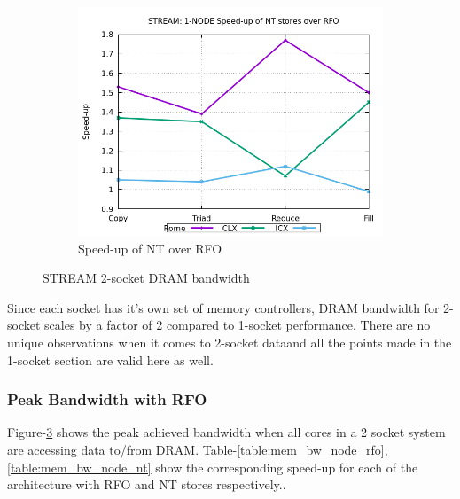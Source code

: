 \documentclass{article}
\begin{document}
\begin{figure}[!ht]
\begin{subfigure}[!hb]{0.3\textwidth}
         \label{figure:mem_bw_node_nt}
    \end{subfigure}
    \begin{subfigure}[!hb]{0.3\textwidth}
         \centering
         \includegraphics[width=\textwidth]{../mem_bw_node/mb_node_nt_rfo}
         \caption{Speed-up of NT over RFO}
         \label{figure:mem_bw_node_nt_rfo}
    \end{subfigure}

    \caption{STREAM 2-socket DRAM bandwidth}
    \label{figure:mem_bw_node}
\end{figure}


Since each socket has it's own set of memory controllers, DRAM bandwidth for 2-socket scales by a factor of 2 compared to 1-socket performance. There are no unique observations when it comes to 2-socket dataand all the points made in the 1-socket section are valid here as well.
\subsubsection{Peak Bandwidth with RFO}
Figure-\ref{figure:mem_bw_node} shows the peak achieved bandwidth when all cores in a 2 socket system are accessing data to/from DRAM. Table-\ref{table:mem_bw_node_rfo}, \ref{table:mem_bw_node_nt} show the corresponding speed-up for each of the architecture with RFO and NT stores respectively..

\begin{table}[h!]
\centering

\caption{2-socket peak bandwdith: RFO}
\label{table:mem_bw_node_rfo}
\end{table}
\end{document}
